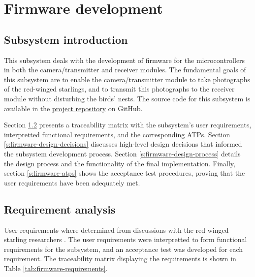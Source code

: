 \chapter{Firmware development \label{ch:firmware}}
\section{Subsystem introduction}

This subsystem deals with the development of firmware for the microcontrollers in both the camera/transmitter and receiver modules. The fundamental goals of this subsystem are to enable the camera/transmitter module to take photographs of the red-winged starlings, and to transmit this photographs to the receiver module without disturbing the birds' nests. The source code for this subsystem is available in the \href{https://github.com/rothdu/EEE4113F-Group13-2024}{project repository} on GitHub.

Section \ref{s:firmware-requirements} presents a traceability matrix with the subsystem's user requirements, interpretted functional requirements, and the corresponding ATPs. Section \ref{s:firmware-design-decisions} discusses high-level design decisions that informed the subsystem development process. Section \ref{s:firmware-design-process} details the design process and the functionality of the final implementation. Finally, section \ref{s:firmware-atps} shows the acceptance test procedures, proving that the user requirements have been adequately met.

\section{Requirement analysis} \label{s:firmware-requirements}
User requirements where determined from discussions with the red-winged starling researchers \cite{hofmeyer2024private}. The user requirements were interpretted to form functional requirements for the subsystem, and an acceptance test was developed for each requirement. The traceability matrix displaying the requirements is shown in Table \ref{tab:firmware-requirements}.

